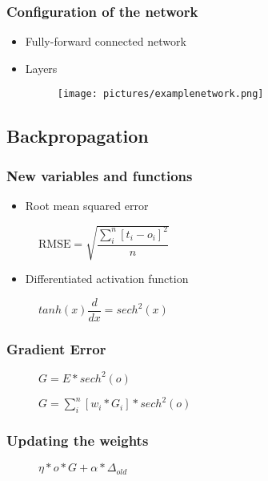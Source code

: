 \begin{frame}
	\frametitle{Configuration of the network}
	\begin{itemize}
		\item Fully-forward connected network
		\item Layers
			\begin{figure}[H]
				\centering
				\texttt{[image: pictures/examplenetwork.png]}
			\end{figure}
	\end{itemize}
\end{frame}

\subsection{Backpropagation}

\begin{frame}
	\frametitle{New variables and functions}
	\begin{itemize}
		\item Root mean squared error
	\end{itemize}
	\begin{figure}[H]
		\centering
		$\text{RMSE} = \sqrt{\dfrac{\sum_{i}^{n}[t_i - o_i]^2}{n}}$\\
		\label{des:neural_RMSE}
	\end{figure}
	\begin{itemize}
		\item Differentiated activation function
	\end{itemize}
	\begin{figure}[H]
		\centering
		$tanh(x)\dfrac{d}{dx} = sech^2(x)$
		\label{des:neural_diff-tanh}
	\end{figure}
\end{frame}

\begin{frame}
	\frametitle{Gradient Error}
		\begin{figure}[H]
			\centering
			$G = E * sech^2(o)$\\
			\label{des:neural_gradient}
		\end{figure}
		\begin{figure}[H]
			\centering
			$G = \sum_{i}^{n}[w_i * G_i]*sech^2(o)$
		\end{figure}
\end{frame}

\begin{frame}
	\frametitle{Updating the weights}
		\begin{figure}[H]
			\centering
			$\eta * o * G + \alpha * \Delta_{old}$
		\end{figure}
\end{frame}